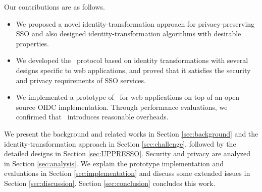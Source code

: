 Our contributions are as follows.
\vspace{-\topsep}
\begin{itemize}
\setlength{\topsep}{0pt}
\setlength{\partopsep}{0pt}
\setlength{\itemsep}{0pt}
\setlength{\parsep}{0pt}
\setlength{\parskip}{0pt}
\item We proposed a novel identity-transformation approach for privacy-preserving SSO and also designed identity-transformation algorithms with desirable properties.
\item We developed the \usso\ protocol based on identity transformations with several designs specific to web applications, and proved that it satisfies the security and privacy requirements of SSO services.
\item We implemented a prototype of \usso\ for web applications on top of an open-source OIDC implementation. Through performance evaluations, we confirmed that \usso\ introduces reasonable overheads.
\end{itemize}


We present the background and related works in Section \ref{sec:background} and the identity-transformation approach in Section \ref{sec:challenge}, followed by the detailed designs in Section \ref{sec:UPPRESSO}.
Security and privacy are analyzed in Section \ref{sec:analysis}.
We explain the prototype implementation and evaluations in Section \ref{sec:implementation} and discuss some extended issues in Section \ref{sec:discussion}. Section \ref{sec:conclusion} concludes this work.
